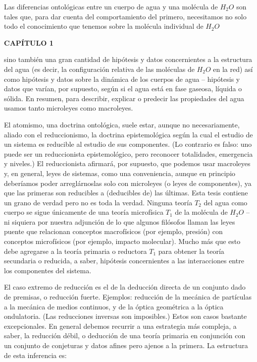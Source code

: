 {Las diferencias ontológicas entre un cuerpo de agua y una molécula de \( H_2O \) son tales que, 
para dar cuenta del comportamiento del primero, necesitamos no solo todo el conocimiento que tenemos sobre la molécula individual de \( H_2O \)
}

\newpage
\fancyhf{}
\fancyhead[l]{\thepage}
\begin{center}
{\fontsize{13}{16}\selectfont \textbf{CAPÍTULO 1}}
\end{center}
\vspace{0.5cm}

{\fontsize{13}{15}\selectfont
sino también una gran cantidad de hipótesis y datos concernientes a la estructura del agua (es decir, la configuración relativa de las moléculas de \( H_2O \) en la red) 
así como hipótesis y datos sobre la dinámica de los cuerpos de agua – hipótesis y datos que varían, por supuesto, según si el agua está en fase gaseosa, líquida o sólida. 
En resumen, para describir, explicar o predecir las propiedades del agua usamos tanto microleyes como macroleyes.

El atomismo, una doctrina ontológica, suele estar, aunque no necesariamente, aliado con el reduccionismo, la doctrina epistemológica según la cual el estudio de un sistema es reducible al estudio de sus componentes. 
(Lo contrario es falso: uno puede ser un reduccionista epistemológico, pero reconocer totalidades, emergencia y niveles.) El reduccionista afirmará, por supuesto, que podemos usar macroleyes y, 
en general, leyes de sistemas, como una conveniencia, aunque en principio deberíamos poder arreglárnoslas solo con microleyes (o leyes de componentes), ya que las primeras son reducibles a (deducibles de) las últimas. 
Esta tesis contiene un grano de verdad pero no es toda la verdad. Ninguna teoría \( T_2 \) del agua como cuerpo se sigue únicamente de una teoría microfísica \( T_1 \) de la molécula de \( H_2O \) – 
ni siquiera por nuestra adjunción de lo que algunos filósofos llaman las leyes puente que relacionan conceptos macrofísicos (por ejemplo, presión) con conceptos microfísicos (por ejemplo, impacto molecular). 
Mucho más que esto debe agregarse a la teoría primaria o reductora \( T_1 \) para obtener la teoría secundaria o reducida, a saber, hipótesis concernientes a las interacciones entre los componentes del sistema.

El caso extremo de reducción es el de la deducción directa de un conjunto dado de premisas, o reducción fuerte. Ejemplos: reducción de la mecánica de partículas a la mecánica de medios continuos, y de la óptica geométrica a la óptica ondulatoria. 
(Las reducciones inversas son imposibles.) Estos son casos bastante excepcionales. En general debemos recurrir a una estrategia más compleja, a saber, la reducción débil, o deducción de una teoría primaria en conjunción con un conjunto de conjeturas 
y datos afines pero ajenos a la primera. La estructura de esta inferencia es:

}
